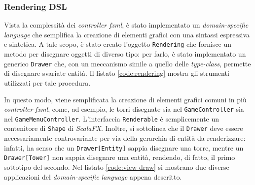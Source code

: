 \subsubsection{Rendering DSL}
Vista la complessità dei \textit{controller fxml}, è stato implementato un \textit{domain-specific language} che
semplifica la creazione di elementi grafici con una sintassi espressiva e sintetica. A tale scopo, è stato creato
l'oggetto \texttt{Rendering} che fornisce un metodo per disegnare oggetti di diverso tipo: per farlo, è stato
implementato un generico \texttt{Drawer} che, con un meccanismo simile a quello delle \textit{type-class}, permette di
disegnare svariate entità. Il listato \ref{code:rendering} mostra gli strumenti utilizzati per tale procedura.



In questo modo, viene semplificata la creazione di elementi grafici comuni in più \textit{controller fxml}, come, ad
esempio, le torri disegnate sia nel \texttt{GameController} sia nel \texttt{GameMenuController}. L'interfaccia
\texttt{Renderable} è semplicemente un contenitore di \texttt{Shape} di \textit{ScalaFX}. Inoltre, si sottolinea che il
\texttt{Drawer} deve essere necessariamente controvariante per via della gerarchia di entità da renderizzare: infatti,
ha senso che un \texttt{Drawer[Entity]} sappia disegnare una torre, mentre un \texttt{Drawer[Tower]} non sappia
disegnare una entità, rendendo, di fatto, il primo sottotipo del secondo. Nel listato \ref{code:view-draw} si mostrano
due diverse applicazioni del \textit{domain-specific language} appena descritto.




